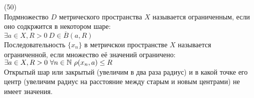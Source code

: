 (50)\\
Подмножество $D$ метрического пространства $X$ называется ограниченным, если оно содкржится в некотором шаре:\\
$\exists a \in X, R > 0\ D \in \overline{B}(a, R)$\\
Последовательность $\{x_n\}$ в метричскои пространстве $X$ называется ограниченной, если множество её значений ограничено:\\
$\exists a \in X, R > 0\ \forall n \in \N\ \rho(x_n, a) \le R$\\
Открытый шар или закрытый (увеличим в два раза радиус) и в какой точке его центр (увеличим радиус на расстояние между старым и новым центрами) не имеет значения.